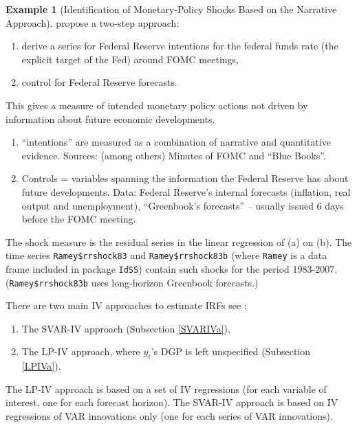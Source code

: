 \documentclass[
  12pt,
]{book}
\providecommand{\tightlist}{%
  \setlength{\itemsep}{0pt}\setlength{\parskip}{0pt}}
\theoremstyle{definition}
\theoremstyle{definition}
\newtheorem{example}{Example}[chapter]
\theoremstyle{definition}
\theoremstyle{definition}
\theoremstyle{remark}
\begin{document}
\begin{example}[Identification of Monetary-Policy Shocks Based on the Narrative Approach]
\protect\hypertarget{exm:RomerRomer}{}\label{exm:RomerRomer}\citet{Romer_Romer_2004} propose a two-step approach:

\begin{enumerate}
\def\labelenumi{\alph{enumi}.}
\tightlist
\item
  derive a series for Federal Reserve intentions for the federal funds rate (the explicit target of the Fed) around FOMC meetings,
\item
  control for Federal Reserve forecasts.
\end{enumerate}

This gives a measure of intended monetary policy actions not driven by information about future economic developments.

\begin{enumerate}
\def\labelenumi{\alph{enumi}.}
\tightlist
\item
  ``intentions'' are measured as a combination of narrative and quantitative evidence. Sources: (among others) Minutes of FOMC and ``Blue Books''.
\item
  Controls = variables spanning the information the Federal Reserve has about future developments. Data: Federal Reserve's internal forecasts (inflation, real output and unemployment), ``Greenbook's forecasts'' -- usually issued 6 days before the FOMC meeting.
\end{enumerate}

The shock measure is the residual series in the linear regression of (a) on (b). The time series \texttt{Ramey\$rrshock83} and \texttt{Ramey\$rrshock83b} (where \texttt{Ramey} is a data frame included in package \texttt{IdSS}) contain such shocks for the period 1983-2007. (\texttt{Ramey\$rrshock83b} uses long-horizon Greenbook forecasts.)
\end{example}

There are two main IV approaches to estimate IRFs see \citet{Stock_Watson_2018}:

\begin{enumerate}
\def\labelenumi{\alph{enumi}.}
\tightlist
\item
  The SVAR-IV approach (Subsection \ref{SVARIVa}),
\item
  The LP-IV approach, where \(y_t\)'s DGP is left unspecified (Subsection \ref{LPIVa}).
\end{enumerate}

The LP-IV approach is based on a set of IV regressions (for each variable of interest, one for each forecast horizon). The SVAR-IV approach is based on IV regressions of VAR innovations only (one for each series of VAR innovations).
\end{document}
